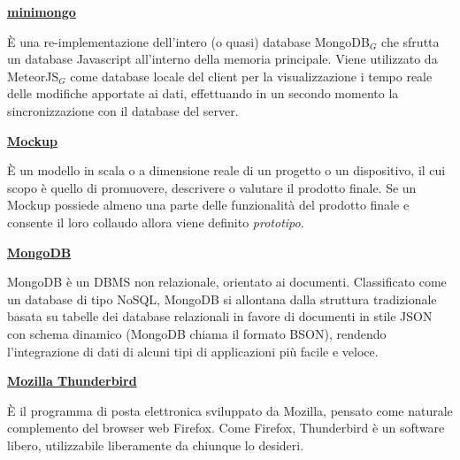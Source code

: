 \bigskip
\begin{addmargin}[0em]{0em}	
	\textbf{\underline{minimongo}} 
\end{addmargin}
	
\medskip
\begin{addmargin}[5em]{1em}	
È una re-implementazione dell'intero (o quasi) database MongoDB$_G$ che sfrutta un database Javascript all'interno della memoria principale. Viene utilizzato da MeteorJS$_G$ come database locale del client per la visualizzazione i tempo reale delle modifiche apportate ai dati, effettuando in un secondo momento la sincronizzazione con il database del server.
\end{addmargin}	


\bigskip
\begin{addmargin}[0em]{0em}	
	\textbf{\underline{Mockup}} 
\end{addmargin}
	
\medskip
\begin{addmargin}[5em]{1em}	
È un modello in scala o a dimensione reale di un progetto o un dispositivo, il cui scopo è quello di promuovere, descrivere o valutare il prodotto finale. Se un Mockup possiede almeno una parte delle funzionalità del prodotto finale e consente il loro collaudo allora viene definito \textit{prototipo}.
\end{addmargin}	

\bigskip
\begin{addmargin}[0em]{0em}	
	\textbf{\underline{MongoDB}} 
\end{addmargin}
	
\medskip
\begin{addmargin}[5em]{1em}	
MongoDB è un DBMS non relazionale, orientato ai documenti. Classificato come un database di tipo NoSQL, MongoDB si allontana dalla struttura tradizionale basata su tabelle dei database relazionali in favore di documenti in stile JSON con schema dinamico (MongoDB chiama il formato BSON), rendendo l'integrazione di dati di alcuni tipi di applicazioni più facile e veloce. 
\end{addmargin}	

\bigskip
\begin{addmargin}[0em]{0em}	
	\textbf{\underline{Mozilla Thunderbird}} 
\end{addmargin}

\medskip
\begin{addmargin}[5em]{1em}	
È il programma di posta elettronica sviluppato da Mozilla, pensato come naturale complemento del browser web Firefox. 
Come Firefox, Thunderbird è un software libero, utilizzabile liberamente da chiunque lo desideri.
\end{addmargin}	

